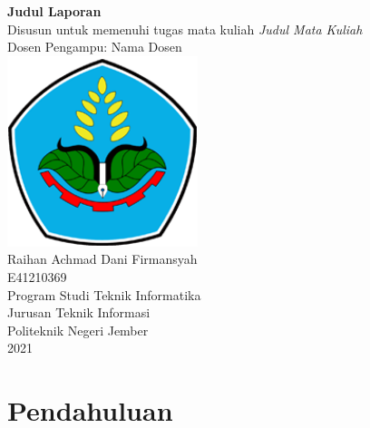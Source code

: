 \documentclass[a4paper]{article}
\begin{document}
\begin{center}


  {\huge \bfseries Judul Laporan}
  \\[0.7em]
  Disusun untuk memenuhi tugas mata kuliah {\it Judul Mata Kuliah}
  \\[0.3em]
  Dosen Pengampu: Nama Dosen
  \\[10em]

  \includegraphics[width=15em]{figs/poliyeay.png}
  \\[3em]
  {\large Raihan Achmad Dani Firmansyah}
  \\[0.7em]
  {\large E41210369}
  \\[15em]

  {\Large Program Studi Teknik Informatika}
    \\[0.7em]
  {\Large Jurusan Teknik Informasi}
    \\[0.7em]
  {\Large Politeknik Negeri Jember}
    \\[0.7em]
  {\Large 2021}

\end{center}

\newpage
\begin{center}
\tableofcontents
\end{center}

\newpage
\section{Pendahuluan}
\end{document}

